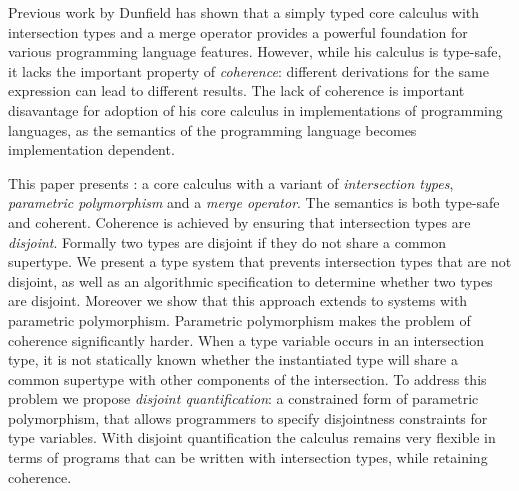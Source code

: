 Previous work by Dunfield has shown that a simply typed core calculus with
intersection types and a merge operator provides a powerful foundation
for various programming language features. However, while his calculus
is type-safe, it lacks the important property of \emph{coherence}:
different derivations for the same expression can lead to different
results. The lack of coherence is important disavantage for adoption
of his core calculus in implementations of programming languages, as
the semantics of the programming language becomes implementation
dependent.

This paper presents \name: a core calculus with a variant of
\emph{intersection types}, \emph{parametric polymorphism} and a
\emph{merge operator}. The semantics \name is both type-safe and
coherent. Coherence is achieved by ensuring that intersection types
are \emph{disjoint}. Formally two types are disjoint if they do not
share a common supertype. We present a type system that prevents
intersection types that are not disjoint, as well as an algorithmic
specification to determine whether two types are disjoint. Moreover we
show that this approach extends to systems with parametric
polymorphism. Parametric polymorphism makes the problem of coherence
significantly harder. When a type variable occurs in an intersection
type, it is not statically known whether the instantiated type will
share a common supertype with other components of the intersection.
To address this problem we propose \emph{disjoint quantification}: a
constrained form of parametric polymorphism, that allows programmers
to specify disjointness constraints for type variables. With disjoint
quantification the calculus remains very flexible in terms of programs 
that can be written with intersection types, while retaining coherence.
